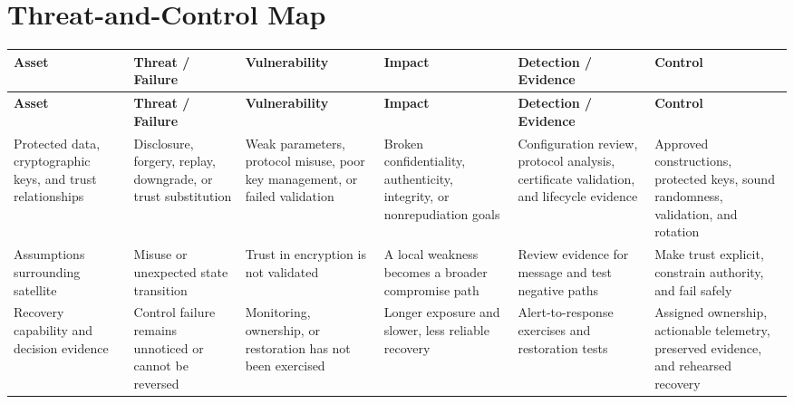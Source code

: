 \documentclass[11pt]{article}
\begin{document}
\section*{Threat-and-Control Map}
\begingroup\scriptsize\setlength{\tabcolsep}{2pt}
\begin{longtable}{>{\RaggedRight\arraybackslash}p{}>{\RaggedRight\arraybackslash}p{}>{\RaggedRight\arraybackslash}p{}>{\RaggedRight\arraybackslash}p{}>{\RaggedRight\arraybackslash}p{}>{\RaggedRight\arraybackslash}p{}}
\toprule\rowcolor{Navy}\color{white}\textbf{Asset} & \color{white}\textbf{Threat / Failure} & \color{white}\textbf{Vulnerability} & \color{white}\textbf{Impact} & \color{white}\textbf{Detection / Evidence} & \color{white}\textbf{Control}\\\midrule
\endfirsthead
\toprule\rowcolor{Navy}\color{white}\textbf{Asset} & \color{white}\textbf{Threat / Failure} & \color{white}\textbf{Vulnerability} & \color{white}\textbf{Impact} & \color{white}\textbf{Detection / Evidence} & \color{white}\textbf{Control}\\\midrule
\endhead
Protected data, cryptographic keys, and trust relationships & Disclosure, forgery, replay, downgrade, or trust substitution & Weak parameters, protocol misuse, poor key management, or failed validation & Broken confidentiality, authenticity, integrity, or nonrepudiation goals & Configuration review, protocol analysis, certificate validation, and lifecycle evidence & Approved constructions, protected keys, sound randomness, validation, and rotation\\\midrule
Assumptions surrounding satellite & Misuse or unexpected state transition & Trust in encryption is not validated & A local weakness becomes a broader compromise path & Review evidence for message and test negative paths & Make trust explicit, constrain authority, and fail safely\\\midrule
Recovery capability and decision evidence & Control failure remains unnoticed or cannot be reversed & Monitoring, ownership, or restoration has not been exercised & Longer exposure and slower, less reliable recovery & Alert-to-response exercises and restoration tests & Assigned ownership, actionable telemetry, preserved evidence, and rehearsed recovery\\\midrule
\bottomrule
\end{longtable}
\endgroup
\end{document}
